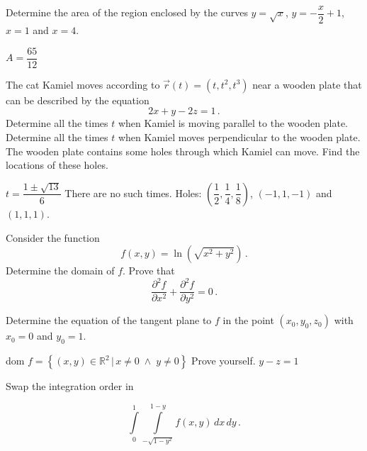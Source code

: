 \begin{Exercise} Determine the area of the region enclosed by the curves $y=\sqrt{x}$, $y=-\dfrac{x}{2}+1$, $x=1$ and $x=4$.
\end{Exercise}

\begin{Answer}
$A = \dfrac{65}{12} $    
\end{Answer}



\begin{Exercise} The cat Kamiel moves according to $\vec{r}(t)=\left(t,t^2,t^3\right)$ near a wooden plate that can be described by the equation
$$
2x+y-2z=1\,. 
$$
\Question Determine all the times $t$ when Kamiel is moving parallel to the wooden plate. 
\Question Determine all the times $t$ when Kamiel moves perpendicular to the wooden plate. 
\Question The wooden plate contains some holes through which Kamiel can move. Find the locations of these holes. 
\end{Exercise}

\begin{Answer}

\Question $t=\dfrac{1\pm\sqrt{13}}{6}$
\Question There are no such times.
\Question Holes: $\left(\dfrac{1}{2},\dfrac{1}{4},\dfrac{1}{8}\right)$, $(-1,1,-1)$ and $(1,1,1)$.
    
\end{Answer}




\begin{Exercise} Consider the function
$$
f(x,y)=\ln\left(\sqrt{x^2+y^2}\right)\,.
$$
\Question Determine the domain of $f$. 
\Question Prove that 
    $$
    \dfrac{\partial^2 f}{\partial x^2}+ \dfrac{\partial^2 f}{\partial y^2}=0\,.
    $$

\Question Determine the equation of the tangent plane to $f$ in the point $(x_0,y_0,z_0)$ with $x_0=0$ and $y_0=1$.
\end{Exercise}

\begin{Answer}

\Question dom $f = \left\{ (x,y)\in\mathbb{R}^2\,|\, x\neq 0\;\wedge\; y\neq 0 \right\}$
\Question Prove yourself.
\Question $y-z=1$
    
\end{Answer}



\begin{Exercise} Swap the integration order in

\[
 \int\limits_0^{1}\int\limits_{-\sqrt{1-y^2}}^{1-y} f(x,y)\,dx\,dy\,.
\]
\end{Exercise}

